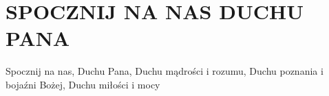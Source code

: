 \documentclass[../../../songbook.tex]{subfiles}
\begin{document}
\TabPositions{8cm} %
\section*{SPOCZNIJ NA NAS DUCHU PANA}
{}
\vspace{0.5cm}
Spocznij na nas, Duchu Pana,		  \newline
Duchu mądrości i rozumu,			  \newline
Duchu poznania i bojaźni Bożej,		\newline
Duchu miłości i mocy				 \newline
	
\end{document}
